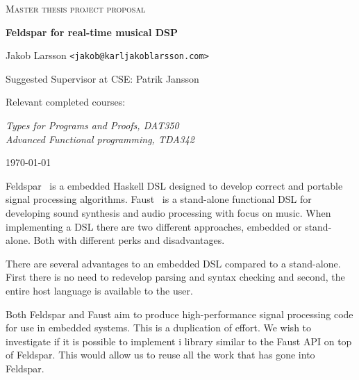 \documentclass{scrartcl}
\begin{document}
\begin{titlepage}

\centering
{\scshape\LARGE Master thesis project proposal}

\vspace{0.5cm}
{\huge\bfseries Feldspar for real-time musical DSP
  }

\vspace{2cm}
{\Large Jakob Larsson \texttt{<jakob@karljakoblarsson.com>}}

\vspace{1.0cm}
{\large Suggested Supervisor at CSE: Patrik Jansson }

\vspace{1.5cm}
{\large Relevant completed courses:}

{\itshape
Types for Programs and Proofs, DAT350 \\
Advanced Functional programming, TDA342 \\
}

\vfill
{\large \today}

\end{titlepage}




Feldspar~\cite{feldspar} is a embedded Haskell DSL designed to develop correct
and portable signal processing algorithms.  Faust~\cite{faust} is a stand-alone
functional DSL for developing sound synthesis and audio processing with focus
on music.  When implementing a DSL there are two different approaches, embedded
or stand-alone. Both with different perks and disadvantages.

There are several advantages to an embedded DSL compared to a stand-alone.
First there is no need to redevelop parsing and syntax checking and second, the
entire host language is available to the user.

Both Feldspar and Faust aim to produce high-performance signal processing code
for use in embedded systems. This is a duplication of effort. We wish to
investigate if it is possible to implement i library similar to the Faust API
on top of Feldspar. This would allow us to reuse all the work that has gone
into Feldspar.
\end{document}
